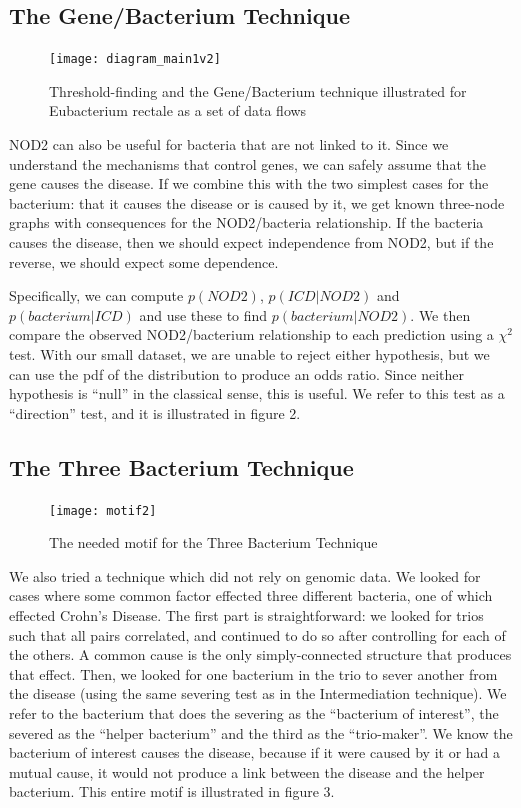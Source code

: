 \documentclass[a4paper]{article}
\begin{document}
\subsection{The Gene/Bacterium Technique}

\begin{figure}[t!]
  \texttt{[image: diagram\_main1v2]}
  \caption{Threshold-finding and the Gene/Bacterium technique
    illustrated for Eubacterium rectale as a set of data flows}
\end{figure}

NOD2 can also be useful for bacteria that are not linked to it.  Since
we understand the mechanisms that control genes, we can safely assume
that the gene causes the disease.  If we combine this with the two simplest
cases for the bacterium: that it causes the disease or is
caused by it, we get known three-node graphs with consequences for the
NOD2/bacteria relationship.  If the bacteria causes the disease, then we should expect independence from
NOD2, but if the reverse, we should expect some dependence.

Specifically, we  can compute $p(NOD2)$, $p(ICD|NOD2)$ and
$p(bacterium|ICD)$ and use these to find $p(bacterium|NOD2)$.  We then
compare the observed NOD2/bacterium relationship to each prediction
using a $\chi^2$ test.  With our small dataset, we are unable to
reject either hypothesis, but we can use the pdf of the distribution
to produce an odds ratio.  Since neither hypothesis is ``null'' in the
classical sense, this is useful.  We refer to this test as a
``direction'' test, and it is illustrated in figure 2.

\subsection{The Three Bacterium Technique}

\begin{figure}
  \texttt{[image: motif2]}
  \caption{The needed motif for the Three Bacterium Technique}
\end{figure}

We also tried a technique which did not rely on genomic data.  We
looked for cases where some common factor effected three different
bacteria, one of which effected Crohn's Disease.  The first part is
straightforward: we looked for trios such that all pairs correlated,
and continued to do so after controlling for each of the others.  A
common cause is the only simply-connected structure that produces that
effect.  Then, we looked for one bacterium in the trio to sever
another from the disease (using the same severing test as in the
Intermediation technique).  We refer to the bacterium that does the
severing as the ``bacterium of interest'', the severed as the ``helper
bacterium'' and the third as the ``trio-maker''.  We know the
bacterium of interest causes the disease, because if it were caused by
it or had a mutual cause, it would not produce a link between the
disease and the helper bacterium.  This entire motif is illustrated
in figure 3.
\end{document}
